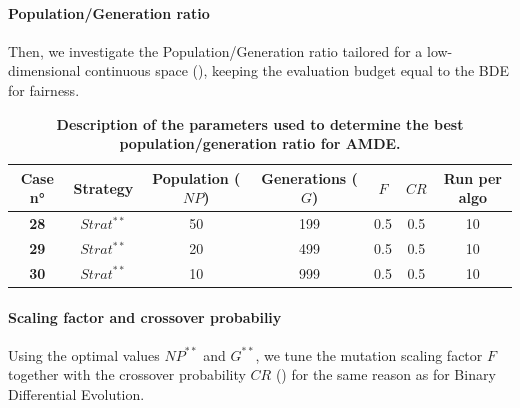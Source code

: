 \documentclass[12pt, openany]{article}
\begin{document}
\paragraph{Population/Generation ratio}

Then, we investigate the Population/Generation ratio tailored for a low-dimensional continuous space (), keeping the evaluation budget equal to the BDE for fairness.

\begin{table}[H]
    \centering
    \renewcommand{\arraystretch}{1.5}
    \begin{tabular}{|c|c|c|c|c|c|c|}
        \hline 
        \textbf{Case n°} & \textbf{Strategy} &\textbf{Population ($NP$)} & \textbf{Generations ($G$)} & $F$ & $CR$ & \textbf{Run per algo} \\ \hline

        \textbf{28} & $Strat^{**}$ & 50 & 199 & 0.5 & 0.5 & 10 \\ \hdashline
        \textbf{29} & $Strat^{**}$ & 20 & 499 & 0.5 & 0.5 & 10 \\ \hdashline
        \textbf{30} & $Strat^{**}$ & 10 & 999 & 0.5 & 0.5 & 10 \\ 
        \hline
    \end{tabular}
    \caption{\textbf{Description of the parameters used to determine the best population/generation ratio for AMDE.}}
    \label{tab:Cases_Determine_AMDE_Pop_Gen}
\end{table}

\paragraph{Scaling factor and crossover probabiliy}

Using the optimal values $NP^{**}$ and $G^{**}$, we tune the mutation scaling factor $F$ together with the crossover probability $CR$ () for the same reason as for Binary Differential Evolution. 
\end{document}
